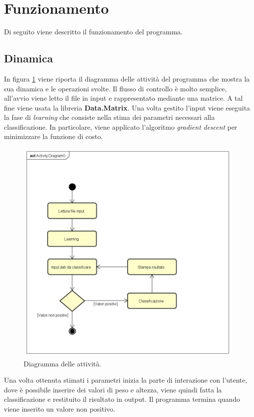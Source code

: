 \section{Funzionamento}
Di seguito viene descritto il funzionamento del programma.

\subsection{Dinamica}
In figura \ref{fig:HaskellActivityDiagram} viene riporta il diagramma delle attività del programma che mostra la sua dinamica e le operazioni svolte. Il flusso di controllo è molto semplice, all'avvio viene letto il file in input e rappresentato mediante una matrice. A tal fine viene usata la libreria \textbf{Data.Matrix}. Una volta gestito l'input viene eseguita la fase di \textit{learning} che consiste nella stima dei parametri necessari alla classificazione. In particolare, viene applicato l'algoritmo \textit{gradient descent} per minimizzare la funzione di costo.
\begin{figure}[ht]
	\centering
	\includegraphics[width=0.9\linewidth]{ImageFiles/haskell/ActivityDiagram}
	\caption{Diagramma delle attività.}
	\label{fig:HaskellActivityDiagram}
\end{figure}
Una volta ottenuta stimati i parametri inizia la parte di interazione con l'utente, dove è possibile inserire dei valori di peso e altezza, viene quindi fatta la classificazione e restituito il risultato in output. Il programma termina quando viene inserito un valore non positivo.